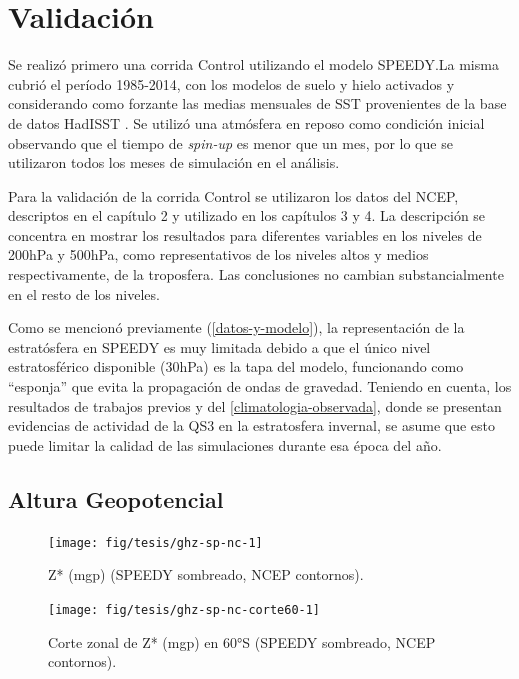 \documentclass[spanish,a4paper,12pt,oneside]{book}
\begin{document}
\section{Validación}\label{validacion}

Se realizó primero una corrida Control utilizando el modelo SPEEDY.La
misma cubrió el período 1985-2014, con los modelos de suelo y hielo
activados y considerando como forzante las medias mensuales de SST
provenientes de la base de datos HadISST \autocite{Rayner2003}. Se
utilizó una atmósfera en reposo como condición inicial observando que el
tiempo de \emph{spin-up} es menor que un mes, por lo que se utilizaron
todos los meses de simulación en el análisis.

Para la validación de la corrida Control se utilizaron los datos del
NCEP, descriptos en el capítulo 2 y utilizado en los capítulos 3 y 4. La
descripción se concentra en mostrar los resultados para diferentes
variables en los niveles de 200hPa y 500hPa, como representativos de los
niveles altos y medios respectivamente, de la troposfera. Las
conclusiones no cambian substancialmente en el resto de los niveles.

Como se mencionó previamente (\autoref{datos-y-modelo}), la
representación de la estratósfera en SPEEDY es muy limitada debido a que
el único nivel estratosférico disponible (30hPa) es la tapa del modelo,
funcionando como ``esponja'' que evita la propagación de ondas de
gravedad. Teniendo en cuenta, los resultados de trabajos previos y del
\autoref{climatologia-observada}, donde se presentan evidencias de
actividad de la QS3 en la estratosfera invernal, se asume que esto puede
limitar la calidad de las simulaciones durante esa época del año.

\subsection{Altura Geopotencial}\label{altura-geopotencial-1}

\begin{landscape}\begin{figure}

{\centering \texttt{[image: fig/tesis/ghz-sp-nc-1]} 

}

\caption{Z* (mgp) (SPEEDY sombreado, NCEP contornos).}\label{fig:ghz-sp-nc}
\end{figure}
\end{landscape}

\begin{figure}
\texttt{[image: fig/tesis/ghz-sp-nc-corte60-1]} \caption{Corte zonal de Z* (mgp) en 60°S (SPEEDY sombreado, NCEP contornos).}\label{fig:ghz-sp-nc-corte60}
\end{figure}
\end{document}
